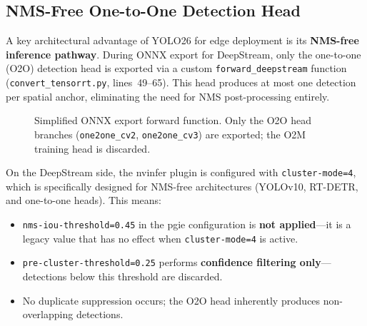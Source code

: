 \documentclass[12pt, titlepage]{article}
\begin{document}
\subsection{NMS-Free One-to-One Detection Head}
\label{sec:nms_free}

A key architectural advantage of YOLO26 for edge deployment is its
\textbf{NMS-free inference pathway}. During ONNX export for DeepStream, only
the one-to-one (O2O) detection head is exported via a custom
\texttt{forward\_deepstream} function (\texttt{convert\_tensorrt.py},
lines~49--65). This head produces at most one detection per spatial anchor,
eliminating the need for NMS post-processing entirely.

\begin{figure}[h]
  \centering
  \caption{Simplified ONNX export forward function.  Only the O2O head
    branches (\texttt{one2one\_cv2}, \texttt{one2one\_cv3}) are exported;
    the O2M training head is discarded.}
  \label{lst:forward_ds}
\end{figure}

On the DeepStream side, the nvinfer plugin is configured with
\texttt{cluster-mode=4}, which is specifically designed for NMS-free
architectures (YOLOv10, RT-DETR, and one-to-one heads). This means:

\begin{itemize}[leftmargin=*]
  \item \texttt{nms-iou-threshold=0.45} in the pgie configuration is
        \textbf{not applied}---it is a legacy value that has no effect
        when \texttt{cluster-mode=4} is active.
  \item \texttt{pre-cluster-threshold=0.25} performs \textbf{confidence
          filtering only}---detections below this threshold are discarded.
  \item No duplicate suppression occurs; the O2O head inherently produces
        non-overlapping detections.
\end{itemize}
\end{document}
